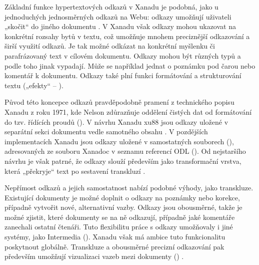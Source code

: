Základní funkce hypertextových odkazů v Xanadu je podobná, jako u jednoduchých jednosměrných odkazů na Webu: odkazy umožňují uživateli „skočit“ do jiného dokumentu \autocite[2/26]{LitMachines}. V Xanadu však odkazy mohou ukazovat na konkrétní rozsahy bytů v textu, což umožňuje mnohem preciznější odkazování a širší využití odkazů. Je tak možné odkázat na konkrétní myšlenku či parafrázovaný text v cílovém dokumentu. Odkazy mohou být různých typů a podle toho jinak vypadají. Může se například jednat o poznámku pod čarou nebo komentář k dokumentu. Odkazy také plní funkci formátování a strukturování textu („efekty“ -- ).

Původ této koncepce odkazů pravděpodobně pramení z technického popisu Xanadu z roku 1971, kde Nelson zdůrazňuje oddělení čistých dat od formátování do tzv. řídících proudů (). V návrhu Xanadu xu88 jsou odkazy uložené v separátní sekci dokumentu vedle samotného obsahu \autocite[4/6]{LitMachines}. V pozdějších implementacích Xanadu jsou odkazy uložené v samostatných souborech (), adresovaných ze souboru Xanadoc v seznamu referencí ODL (). Od nejstaršího návrhu je však patrné, že odkazy slouží především jako transformační vrstva, která „překryje“ text po sestavení transkluzí \autocite{xanasimp}.

Nepřímost odkazů a jejich samostatnost nabízí podobné výhody, jako transkluze. Existující dokumenty je možné doplnit o odkazy na poznámky nebo korekce, případně vytvořit nové, alternativní vazby. Odkazy jsou obousměrné, takže je možné zjistit, které dokumenty se na ně odkazují, případně jaké komentáře zanechali ostatní čtenáři. Tuto flexibilitu práce s odkazy umožňovaly i jiné systémy, jako Intermedia (). Xanadu však má ambice tuto funkcionalitu poskytnout globálně. 
Transkluze a obousměrné precizní odkazování pak především umožňují vizualizaci vazeb mezi dokumenty () .




